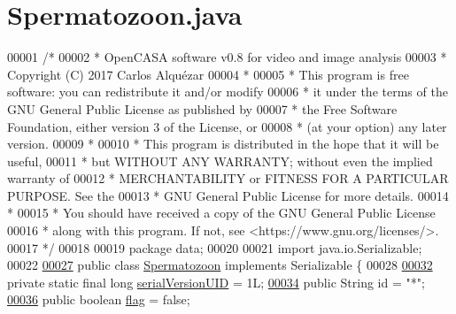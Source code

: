 \hypertarget{_spermatozoon_8java_source}{}\section{Spermatozoon.\+java}
\label{_spermatozoon_8java_source}

\begin{DoxyCode}
00001 \textcolor{comment}{/*}
00002 \textcolor{comment}{ *   OpenCASA software v0.8 for video and image analysis}
00003 \textcolor{comment}{ *   Copyright (C) 2017  Carlos Alquézar}
00004 \textcolor{comment}{ *}
00005 \textcolor{comment}{ *   This program is free software: you can redistribute it and/or modify}
00006 \textcolor{comment}{ *   it under the terms of the GNU General Public License as published by}
00007 \textcolor{comment}{ *   the Free Software Foundation, either version 3 of the License, or}
00008 \textcolor{comment}{ *   (at your option) any later version.}
00009 \textcolor{comment}{ *}
00010 \textcolor{comment}{ *   This program is distributed in the hope that it will be useful,}
00011 \textcolor{comment}{ *   but WITHOUT ANY WARRANTY; without even the implied warranty of}
00012 \textcolor{comment}{ *   MERCHANTABILITY or FITNESS FOR A PARTICULAR PURPOSE.  See the}
00013 \textcolor{comment}{ *   GNU General Public License for more details.}
00014 \textcolor{comment}{ *}
00015 \textcolor{comment}{ *   You should have received a copy of the GNU General Public License}
00016 \textcolor{comment}{ *   along with this program.  If not, see <https://www.gnu.org/licenses/>.}
00017 \textcolor{comment}{*/}    
00018 
00019 \textcolor{keyword}{package }data;
00020 
00021 \textcolor{keyword}{import} java.io.Serializable;
00022 
\hypertarget{_spermatozoon_8java_source_l00027}{}\hyperlink{classdata_1_1_spermatozoon}{00027} \textcolor{keyword}{public} \textcolor{keyword}{class }\hyperlink{classdata_1_1_spermatozoon}{Spermatozoon} \textcolor{keyword}{implements} Serializable \{
00028 
\hypertarget{_spermatozoon_8java_source_l00032}{}\hyperlink{classdata_1_1_spermatozoon_a3238d314ecdee14d2966760945d00c3b}{00032}   \textcolor{keyword}{private} \textcolor{keyword}{static} \textcolor{keyword}{final} \textcolor{keywordtype}{long} \hyperlink{classdata_1_1_spermatozoon_a3238d314ecdee14d2966760945d00c3b}{serialVersionUID} = 1L;
\hypertarget{_spermatozoon_8java_source_l00034}{}\hyperlink{classdata_1_1_spermatozoon_a76010eef1edc0406cc2375c25d2a433d}{00034}   \textcolor{keyword}{public} String \textcolor{keywordtype}{id} = \textcolor{stringliteral}{"*"};
\hypertarget{_spermatozoon_8java_source_l00036}{}\hyperlink{classdata_1_1_spermatozoon_ab46c49fb62e0ee61b3865f1e9153fdaa}{00036}   \textcolor{keyword}{public} \textcolor{keywordtype}{boolean} \hyperlink{classdata_1_1_spermatozoon_ab46c49fb62e0ee61b3865f1e9153fdaa}{flag} = \textcolor{keyword}{false};

\end{DoxyCode}

